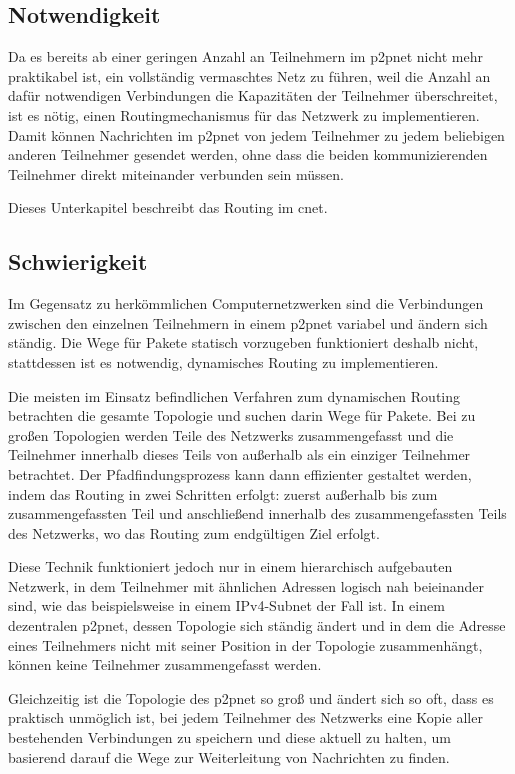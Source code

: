 
\subsection{Notwendigkeit}
Da es bereits ab einer geringen Anzahl an Teilnehmern im \gls{p2pnet} nicht mehr praktikabel ist,
ein vollständig vermaschtes Netz zu führen, weil die Anzahl an dafür notwendigen Verbindungen die
Kapazitäten der Teilnehmer überschreitet, ist es nötig, einen Routingmechanismus für das Netzwerk
zu implementieren. Damit können Nachrichten im \gls{p2pnet} von jedem Teilnehmer zu jedem beliebigen
anderen Teilnehmer gesendet werden, ohne dass die beiden kommunizierenden Teilnehmer direkt
miteinander verbunden sein müssen.

Dieses Unterkapitel beschreibt das Routing im \gls{cnet}.

\subsection{Schwierigkeit}
Im Gegensatz zu herkömmlichen Computernetzwerken sind die Verbindungen zwischen den einzelnen
Teilnehmern in einem \gls{p2pnet} variabel und ändern sich ständig. Die Wege für Pakete statisch
vorzugeben funktioniert deshalb nicht, stattdessen ist es notwendig, dynamisches Routing zu
implementieren.

Die meisten im Einsatz befindlichen Verfahren zum dynamischen Routing betrachten die gesamte
Topologie und suchen darin Wege für Pakete. Bei zu großen Topologien werden Teile des Netzwerks
zusammengefasst und die Teilnehmer innerhalb dieses Teils von außerhalb als ein einziger Teilnehmer
betrachtet. Der Pfadfindungsprozess kann dann effizienter gestaltet werden, indem das Routing in
zwei Schritten erfolgt: zuerst außerhalb bis zum zusammengefassten Teil und anschließend innerhalb
des zusammengefassten Teils des Netzwerks, wo das Routing zum endgültigen Ziel erfolgt.

Diese Technik funktioniert jedoch nur in einem hierarchisch aufgebauten Netzwerk, in dem Teilnehmer
mit ähnlichen Adressen logisch nah beieinander sind, wie das beispielsweise in einem IPv4-Subnet
der Fall ist. In einem dezentralen \gls{p2pnet}, dessen Topologie sich ständig ändert und in dem
die Adresse eines Teilnehmers nicht mit seiner Position in der Topologie zusammenhängt, können
keine Teilnehmer zusammengefasst werden.

Gleichzeitig ist die Topologie des \gls{p2pnet} so groß und ändert sich so oft, dass es praktisch
unmöglich ist, bei jedem Teilnehmer des Netzwerks eine Kopie aller bestehenden Verbindungen zu
speichern und diese aktuell zu halten, um basierend darauf die Wege zur Weiterleitung von
Nachrichten zu finden.


